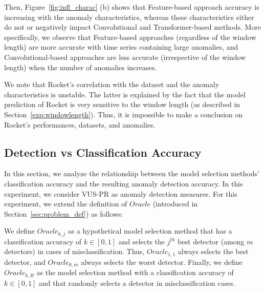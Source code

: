 Then, Figure~\ref{fig:infl_charac} (b) shows that Feature-based approach accuracy is increasing with the anomaly characteristics, whereas these characteristics either do not or negatively impact Convolutional and Transformer-based methods. More specifically, we observe that Feature-based approaches (regardless of the window length) are more accurate with time series containing large anomalies, and Convolutional-based approaches are less accurate (irrespective of the window length) when the number of anomalies increases.

We note that Rocket's correlation with the dataset and the anomaly characteristics is unstable. The latter is explained by the fact that the model prediction of Rocket is very sensitive to the window length (as described in Section~\ref{exp:windowlength}). Thus, it is impossible to make a conclusion on Rocket's performances, datasets, and anomalies.


\subsection{Detection vs Classification Accuracy}
\label{exp:detectionvsclass}

In this section, we analyze the relationship between the model selection methods' classification accuracy and the resulting anomaly detection accuracy. In this experiment, we consider VUS-PR as anomaly detection measures. For this experiment, we extend the definition of $Oracle$ (introduced in Section~\ref{sec:problem_def}) as follows:

\begin{definition}
    We define $Oracle_{k,j}$ as a hypothetical model selection method that has a classification accuracy of $k \in [0,1]$ and selects the $j^{th}$ best detector (among $m$ detectors) in cases of misclassification. Thus, $Oracle_{1,1}$ always selects the best detector, and $Oracle_{0,m}$ always selects the worst detector. Finally, we define $Oracle_{k,R}$ as the model selection method with a classification accuracy of $k \in [0,1]$ and that randomly selects a detector in misclassification cases.
    \end{definition}

